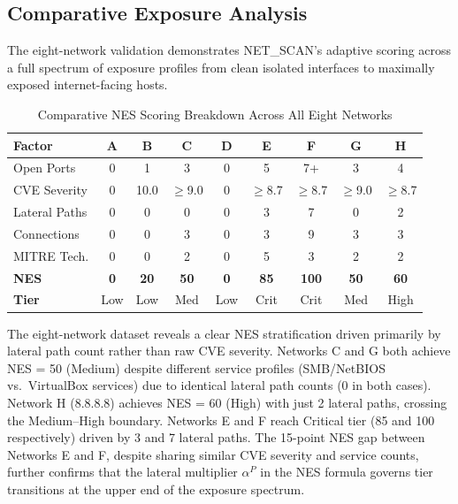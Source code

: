 \documentclass[conference]{IEEEtran}
\begin{document}
\subsection{Comparative Exposure Analysis}
The eight-network validation demonstrates NET\_SCAN's adaptive scoring across a full spectrum of exposure profiles from clean isolated interfaces to maximally exposed internet-facing hosts.

\begin{table}[htbp]
\caption{Comparative NES Scoring Breakdown Across All Eight Networks}
\begin{center}
\begin{tabular}{|l|c|c|c|c|c|c|c|c|}
\hline
\textbf{Factor} & \textbf{A} & \textbf{B} & \textbf{C} & \textbf{D} & \textbf{E} & \textbf{F} & \textbf{G} & \textbf{H} \\
\hline
Open Ports & 0 & 1 & 3 & 0 & 5 & 7+ & 3 & 4 \\
\hline
CVE Severity & 0 & 10.0 & $\geq$9.0 & 0 & $\geq$8.7 & $\geq$8.7 & $\geq$9.0 & $\geq$8.7 \\
\hline
Lateral Paths & 0 & 0 & 0 & 0 & 3 & 7 & 0 & 2 \\
\hline
Connections & 0 & 0 & 3 & 0 & 3 & 9 & 3 & 3 \\
\hline
MITRE Tech. & 0 & 0 & 2 & 0 & 5 & 3 & 2 & 2 \\
\hline
\textbf{NES} & \textbf{0} & \textbf{20} & \textbf{50} & \textbf{0} & \textbf{85} & \textbf{100} & \textbf{50} & \textbf{60} \\
\hline
\textbf{Tier} & Low & Low & Med & Low & Crit & Crit & Med & High \\
\hline
\end{tabular}
\label{tab:nes_comparison}
\end{center}
\end{table}

The eight-network dataset reveals a clear NES stratification driven primarily by lateral path count rather than raw CVE severity. Networks C and G both achieve NES = 50 (Medium) despite different service profiles (SMB/NetBIOS vs.\ VirtualBox services) due to identical lateral path counts (0 in both cases). Network H (8.8.8.8) achieves NES = 60 (High) with just 2 lateral paths, crossing the Medium--High boundary. Networks E and F reach Critical tier (85 and 100 respectively) driven by 3 and 7 lateral paths. The 15-point NES gap between Networks E and F, despite sharing similar CVE severity and service counts, further confirms that the lateral multiplier $\alpha^{P}$ in the NES formula governs tier transitions at the upper end of the exposure spectrum.
\end{document}
